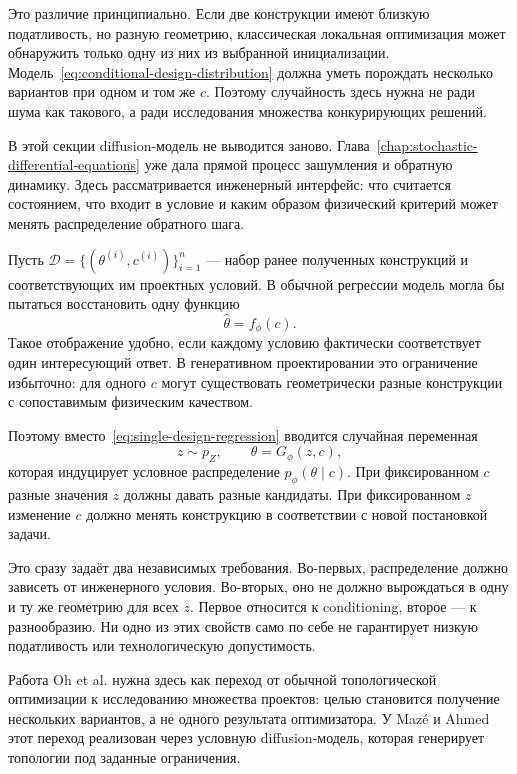 Это различие принципиально. Если две конструкции имеют близкую податливость, но разную геометрию, классическая локальная оптимизация может обнаружить только одну из них из выбранной инициализации. Модель~\eqref{eq:conditional-design-distribution} должна уметь порождать несколько вариантов при одном и том же $c$. Поэтому случайность здесь нужна не ради шума как такового, а ради исследования множества конкурирующих решений.

В этой секции diffusion-модель не выводится заново. Глава~\ref{chap:stochastic-differential-equations} уже дала прямой процесс зашумления и обратную динамику. Здесь рассматривается инженерный интерфейс: что считается состоянием, что входит в условие и каким образом физический критерий может менять распределение обратного шага.

Пусть $\mathcal D=\{(\theta^{(i)},c^{(i)})\}_{i=1}^{n}$ --- набор ранее полученных конструкций и соответствующих им проектных условий. В обычной регрессии модель могла бы пытаться восстановить одну функцию
\begin{equation}
\label{eq:single-design-regression}
 \widehat\theta=f_\phi(c).
\end{equation}
Такое отображение удобно, если каждому условию фактически соответствует один интересующий ответ. В генеративном проектировании это ограничение избыточно: для одного $c$ могут существовать геометрически разные конструкции с сопоставимым физическим качеством.

Поэтому вместо~\eqref{eq:single-design-regression} вводится случайная переменная
\begin{equation}
 z\sim p_Z,
 \qquad
 \theta=G_\phi(z,c),
\end{equation}
которая индуцирует условное распределение $p_\phi(\theta\mid c)$. При фиксированном $c$ разные значения $z$ должны давать разные кандидаты. При фиксированном $z$ изменение $c$ должно менять конструкцию в соответствии с новой постановкой задачи.

Это сразу задаёт два независимых требования. Во-первых, распределение должно зависеть от инженерного условия. Во-вторых, оно не должно вырождаться в одну и ту же геометрию для всех $z$. Первое относится к conditioning, второе --- к разнообразию. Ни одно из этих свойств само по себе не гарантирует низкую податливость или технологическую допустимость.

Работа Oh et al. нужна здесь как переход от обычной топологической оптимизации к исследованию множества проектов: целью становится получение нескольких вариантов, а не одного результата оптимизатора. У Mazé и Ahmed этот переход реализован через условную diffusion-модель, которая генерирует топологии под заданные ограничения.

